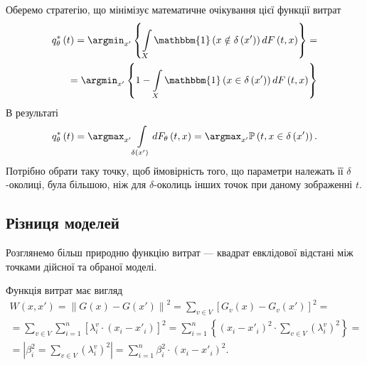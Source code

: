 Оберемо стратегію, що мінімізує математичне очікування цієї функції витрат
\begin{equation*}
  \begin{split}
    q^*_{\theta}\left( t \right)
    = \argmin_{x'} \left\{
      \int\limits_{X}
        \mathbbm{1} \left( x \notin \delta\left( x' \right) \right)
        d F\left( t, x \right)
      \right\} = \\
    = \argmin_{x'} \left\{
      1 -
      \int\limits_{X}
        \mathbbm{1} \left( x \in \delta\left( x' \right) \right)
        d F\left( t, x \right)
      \right\}
  \end{split}
\end{equation*}
В результаті
\begin{equation*}
  q^*_{\theta}\left( t \right)
  = \argmax_{x'} \int\limits_{\delta\left( x' \right)}
    dF_{\theta}\left( t, x \right)
  = \argmax_{x'} \mathbb{P} \left( t, x \in \delta\left( x' \right) \right).
\end{equation*}
Потрібно обрати таку точку,
щоб ймовірність того,
що параметри належать її $\delta$-околиці,
була більшою,
ніж для $\delta$-околиць інших точок при даному зображенні $t$.

\subsection{Різниця моделей}

Розглянемо більш природню функцію витрат ---
квадрат евклідової відстані між точками дійсної та обраної моделі.

Функція витрат має вигляд
\begin{equation*}
  \begin{split}
    W \left( x, x' \right)
    = \left\| G\left( x \right) - G\left( x' \right) \right\|^2
    = \sum_{v \in V} \left[
        G_v\left( x \right) - G_v\left( x' \right)
      \right]^2 = \\
    = \sum_{v \in V} \sum_{i = 1}^n \left[
        \lambda_i^v \cdot \left( x_i - x'_i \right)
      \right]^2
    = \sum_{i = 1}^n \left\{ \left( x_i - x'_i \right)^2
      \cdot \sum_{v \in V} \left( \lambda_i^v \right)^2 \right\} = \\
    = \left| \beta_i^2 = \sum_{v \in V} \left( \lambda_i^v \right)^2 \right|
    = \sum_{i = 1}^n \beta_i^2 \cdot \left( x_i - x'_i \right)^2.
  \end{split}
\end{equation*}

